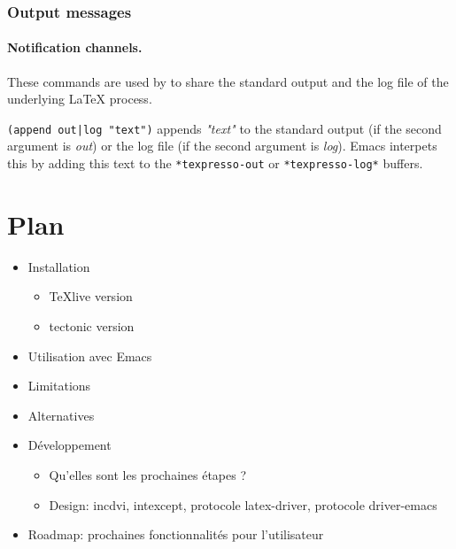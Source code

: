 \documentclass{article}
\begin{document}
\subsubsection{Output messages}

\paragraph{Notification channels.} These commands are used by \txp to share the standard output and the log file of the underlying \LaTeX{} process.

\texttt{(append out|log "text")} appends {\em "text"} to the standard output (if the second argument is {\em out}) or the log file (if the second argument is {\em log}). Emacs interpets this by adding this text to the \texttt{*texpresso-out} or \texttt{*texpresso-log*} buffers.

\section{Plan}
\begin{itemize}
  \item Installation
    \begin{itemize}
      \item \TeX{}live version
      \item tectonic version
    \end{itemize}
  \item Utilisation avec Emacs
  \item Limitations
  \item Alternatives
  \item Développement
    \begin{itemize}
      \item Qu'elles sont les prochaines étapes ?
      \item Design: incdvi, intexcept, protocole latex-driver, protocole driver-emacs
    \end{itemize}
  \item Roadmap: prochaines fonctionnalités pour l'utilisateur
\end{itemize}
\end{document}
